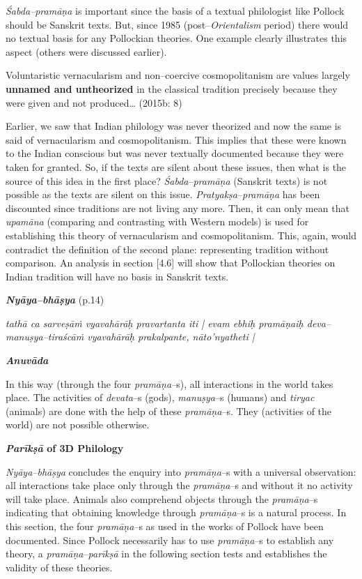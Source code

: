 \textit{Śabda–pramāṇa} is important since the basis of a textual philologist like Pollock should be Sanskrit texts. But, since 1985 (post–\textit{Orientalism} period) there would no textual basis for any Pollockian theories. One example clearly illustrates this aspect (others were discussed earlier).

\begin{myquote}
Voluntaristic vernacularism and non–coercive cosmopolitanism are values largely \textbf{unnamed and untheorized} in the classical tradition precisely because they were given and not produced… (2015b: 8)
\end{myquote}

Earlier, we saw that Indian philology was never theorized and now the same is said of vernacularism and cosmopolitanism. This implies that these were known to the Indian conscious but was never textually documented because they were taken for granted. So, if the texts are silent about these issues, then what is the source of this idea in the first place? \textit{Śabda}–\textit{pramāṇa} (Sanskrit texts) is not possible as the texts are silent on this issue. \textit{Pratyakṣa}–\textit{pramāṇa} has been discounted since traditions are not living any more. Then, it can only mean that \textit{upamāna} (comparing and contrasting with Western models) is used for establishing this theory of vernacularism and cosmopolitanism. This, again, would contradict the definition of the second plane: representing tradition without comparison. An analysis in section [4.6] will show that Pollockian theories on Indian tradition will have no basis in Sanskrit texts.

\textit{\textbf{Nyāya–bhāṣya}} (p.14)

\begin{myquote}
\textit{tathā ca sarveṣāṁ vyavahārāḥ pravartanta iti | evam ebhiḥ pramāṇaiḥ deva–manuṣya–tiraścāṁ vyavahārāḥ prakalpante, nāto'nyatheti |}
\end{myquote}

\textit{\textbf{Anuvāda}}

In this way (through the four \textit{pramāṇa–}s), all interactions in the world takes place. The activities of \textit{devata}–s (gods), \textit{manuṣya}–s (humans) and \textit{tiryac} (animals) are done with the help of these \textit{pramāṇa}–s. They (activities of the world) are not possible otherwise.

\textbf{\textit{Parīkṣā} of 3D Philology}

\textit{Nyāya–bhāṣya} concludes the enquiry into\textit{ pramāṇa}–s with a universal observation: all interactions take place only through the \textit{pramāṇa}–s and without it no activity will take place. Animals also comprehend objects through the \textit{pramāṇa}–s indicating that obtaining knowledge through\textit{ pramāṇa}–s is a natural process. In this section, the four \textit{pramāṇa}–s as used in the works of Pollock have been documented. Since Pollock necessarily has to use \textit{pramāṇa}–s to establish any theory, a \textit{pramāṇa}–\textit{parīkṣā} in the following section tests and establishes the validity of these theories.

